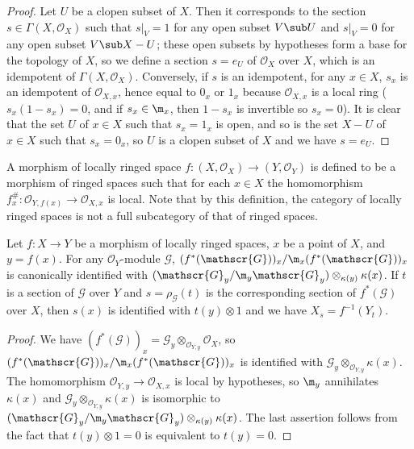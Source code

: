 \begin{proof}
Let $U$ be a clopen subset of $X$. Then it corresponds to the section $s\in\Gamma(X,\mathscr{O}_X)$ such that $s|_V=1$ for any open subset $V\sub U$ and $s|_V=0$ for any open subset $V\sub X-U$; these open subsets by hypotheses form a base for the topology of $X$, so we define a section $s=e_U$ of $\mathscr{O}_X$ over $X$, which is an idempotent of $\Gamma(X,\mathscr{O}_X)$. Conversely, if $s$ is an idempotent, for any $x\in X$, $s_x$ is an idempotent of $\mathscr{O}_{X,x}$, hence equal to $0_x$ or $1_x$ because $\mathscr{O}_{X,x}$ is a local ring ($s_x(1-s_x)=0$, and if $s_x\in\m_x$, then $1-s_x$ is invertible so $s_x=0$). It is clear that the set $U$ of $x\in X$ such that $s_x=1_x$ is open, and so is the set $X-U$ of $x\in X$ such that $s_x=0_x$, so $U$ is a clopen subset of $X$ and we have $s=e_U$. 
\end{proof}
A morphism of locally ringed space $f:(X,\mathscr{O}_X)\to(Y,\mathscr{O}_Y)$ is defined to be a morphism of ringed spaces such that for each $x\in X$ the homomorphism $f_{x}^{\#}:\mathscr{O}_{Y,f(x)}\to\mathscr{O}_{X,x}$ is local. Note that by this definition, the category of locally ringed spaces is not a full subcategory of that of ringed spaces.
\begin{proposition}\label{ringed space local residue of pullback char}
Let $f:X\to Y$ be a morphism of locally ringed spaces, $x$ be a point of $X$, and $y=f(x)$. For any $\mathscr{O}_Y$-module $\mathscr{G}$, $(f^*(\mathscr{G}))_x/\m_x(f^*(\mathscr{G}))_x$ is canonically identified with $(\mathscr{G}_y/\m_y\mathscr{G}_y)\otimes_{\kappa(y)}\kappa(x)$. If $t$ is a section of $\mathscr{G}$ over $Y$ and $s=\rho_{\mathscr{G}}(t)$ is the corresponding section of $f^*(\mathscr{G})$ over $X$, then $s(x)$ is identified with $t(y)\otimes 1$ and we have $X_s=f^{-1}(Y_t)$.
\end{proposition}
\begin{proof}
We have $(f^*(\mathscr{G}))_x=\mathscr{G}_y\otimes_{\mathscr{O}_{Y,y}}\mathscr{O}_X$, so $(f^*(\mathscr{G}))_x/\m_x(f^*(\mathscr{G}))_x$ is identified with $\mathscr{G}_y\otimes_{\mathscr{O}_{Y,y}}\kappa(x)$. The homomorphism $\mathscr{O}_{Y,y}\to\mathscr{O}_{X,x}$ is local by hypotheses, so $\m_y$ annihilates $\kappa(x)$ and $\mathscr{G}_y\otimes_{\mathscr{O}_{Y,y}}\kappa(x)$ is isomorphic to $(\mathscr{G}_y/\m_y\mathscr{G}_y)\otimes_{\kappa(y)}\kappa(x)$. The last assertion follows from the fact that $t(y)\otimes 1=0$ is equivalent to $t(y)=0$.
\end{proof}
